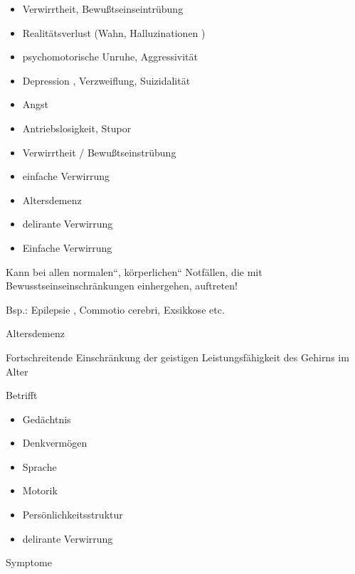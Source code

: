 \documentclass{article}
\begin{document}
\begin{itemize}
\item Verwirrtheit, Bewu{\ss}tseinseintr\"ubung

\item Realit\"atsverlust (Wahn, Halluzinationen )

\item psychomotorische Unruhe, Aggressivit\"at

\item Depression , Verzweiflung, Suizidalit\"at

\item Angst

\item Antriebslosigkeit, Stupor

\item Verwirrtheit / Bewu{\ss}tseinstr\"ubung

\item einfache Verwirrung

\item Altersdemenz

\item delirante Verwirrung

\item Einfache Verwirrung

\end{itemize}
Kann bei allen {\quotedblbase}normalen{\textquotedblleft},
{\quotedblbase}k\"orperlichen{\textquotedblleft} Notf\"allen, die mit
Bewusstseins\-ein\-schr\"ankungen ein\-her\-gehen, auftreten!

Bsp.: Epilepsie , Commotio cerebri, Exsikkose etc.

Altersdemenz

Fortschreitende Einschr\"ankung der  geistigen Leistungsf\"ahigkeit des
Gehirns  im Alter

Betrifft

\begin{itemize}
\item Ged\"achtnis

\item Denkverm\"ogen

\item Sprache

\item Motorik

\item Pers\"onlichkeitsstruktur

\item delirante Verwirrung

\end{itemize}
Symptome
\end{document}
